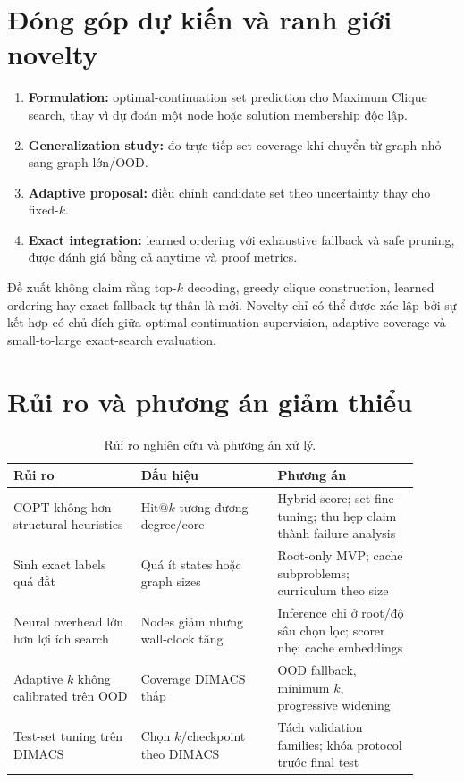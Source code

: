 \documentclass[11pt,a4paper]{article}
\makeatletter
\newcommand{\hitk}{\mathrm{Hit@}k}
\makeatother
\begin{document}
\section{Đóng góp dự kiến và ranh giới novelty}

\begin{enumerate}
    \item \textbf{Formulation:} optimal-continuation set prediction cho Maximum Clique search, thay vì dự đoán một node hoặc solution membership độc lập.
    \item \textbf{Generalization study:} đo trực tiếp set coverage khi chuyển từ graph nhỏ sang graph lớn/OOD.
    \item \textbf{Adaptive proposal:} điều chỉnh candidate set theo uncertainty thay cho fixed-$k$.
    \item \textbf{Exact integration:} learned ordering với exhaustive fallback và safe pruning, được đánh giá bằng cả anytime và proof metrics.
\end{enumerate}

Đề xuất không claim rằng top-$k$ decoding, greedy clique construction, learned ordering hay exact fallback tự thân là mới. Novelty chỉ có thể được xác lập bởi sự kết hợp có chủ đích giữa optimal-continuation supervision, adaptive coverage và small-to-large exact-search evaluation.

\section{Rủi ro và phương án giảm thiểu}

\begin{table}[ht]
    \centering
    \small
    \caption{Rủi ro nghiên cứu và phương án xử lý.}
    \begin{tabular}{p{0.29\linewidth}p{0.30\linewidth}p{0.31\linewidth}}
        \toprule
        Rủi ro & Dấu hiệu & Phương án \\
        \midrule
        COPT không hơn structural heuristics & $\hitk$ tương đương degree/core & Hybrid score; set fine-tuning; thu hẹp claim thành failure analysis \\
        Sinh exact labels quá đắt & Quá ít states hoặc graph sizes & Root-only MVP; cache subproblems; curriculum theo size \\
        Neural overhead lớn hơn lợi ích search & Nodes giảm nhưng wall-clock tăng & Inference chỉ ở root/độ sâu chọn lọc; scorer nhẹ; cache embeddings \\
        Adaptive $k$ không calibrated trên OOD & Coverage DIMACS thấp & OOD fallback, minimum $k$, progressive widening \\
        Test-set tuning trên DIMACS & Chọn $k$/checkpoint theo DIMACS & Tách validation families; khóa protocol trước final test \\
        \bottomrule
    \end{tabular}
\end{table}
\end{document}
